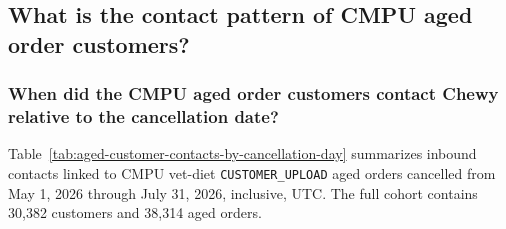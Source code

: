 \clearpage
\subsection{What is the contact pattern of CMPU aged order customers?}\label{subsec:contact-analysis}

\clearpage
\subsubsection{When did the CMPU aged order customers contact Chewy relative to the cancellation date?}
Table~\ref{tab:aged-customer-contacts-by-cancellation-day} summarizes inbound
contacts linked to CMPU vet-diet \texttt{CUSTOMER\_UPLOAD} aged orders cancelled
from May 1, 2026 through July 31, 2026, inclusive, UTC.
The full cohort contains 30,382 customers and 38,314 aged orders.

